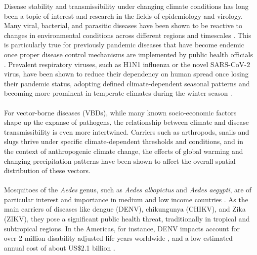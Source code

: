 \documentclass[10pt,twocolumn]{wlscirep}
\begin{document}
Disease stability and transmissibility under changing climate conditions has long been a topic of interest and research in the fields of epidemiology and virology. Many viral, bacterial, and parasitic diseases have been shown to be reactive to changes in environmental conditions across different regions and timescales \cite{thomson_2008, malloy_2019}. This is particularly true for previously pandemic diseases that have become endemic once proper disease control mechanisms are implemented by public health officials \cite{li_2019} . Prevalent respiratory viruses, such as H1N1 influenza or the novel SARS-CoV-2 virus, have been shown to reduce their dependency on human spread once losing their pandemic status, adopting defined climate-dependent seasonal patterns and becoming more prominent in temperate climates during the winter season \cite{shaman_2011, romerostarke_2021}.
\\
\\
For vector-borne diseases (VBDs), while many known socio-economic factors shape up the expanse of pathogens\cite{lippi_2018, ibarra_2013, stewart-ibarra_2014}, the relationship between climate and disease transmissibility is even more intertwined. Carriers such as arthropods, snails and slugs thrive under specific climate-dependent thresholds and conditions, and in the context of anthropogenic climate change, the effects of global warming and changing precipitation patterns have been shown to affect the overall spatial distribution of these vectors\cite{lowe_2018, messina_2016}.
\\
\\
Mosquitoes of the \textit{Aedes} genus, such as \textit{Aedes albopictus} and \textit{Aedes aegypti}, are of particular interest and importance in medium and low income countries \cite{campbell-lendrum_2015}. As the main carriers of diseases like dengue (DENV), chikungunya (CHIKV), and Zika (ZIKV), they pose a significant public health threat, traditionally in tropical and subtropical regions\cite{OMS_2020}. In the Americas, for instance, DENV impacts account for over 2 million disability adjusted life years worldwide \cite{yang_2021}, and a low estimated annual cost of about US\$2.1 billion \cite{shepard_2011}.
\\
\\
\end{document}
